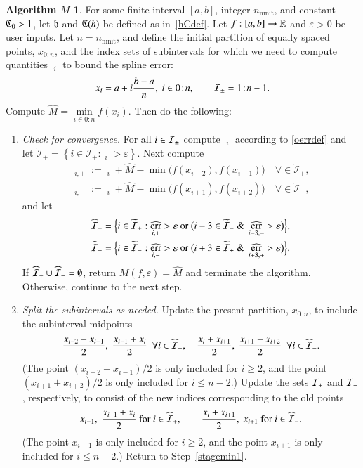 \documentclass[review]{elsarticle}
\newcommand{\abstol}{\varepsilon}
\newcommand{\zton}{0\!:\!n}
\theoremstyle{definition}
\newtheorem*{algoM}{Algorithm $M$}
\newcommand{\hM}{\widehat{M}}
\DeclareMathOperator{\ninit}{ninit}
\DeclareMathOperator{\oerr}{\overline{err}}
\DeclareMathOperator{\herr}{\widehat{err}}
\newcommand{\minfi}{\min\limits_{i \in 0:n} f(x_i)} %
\begin{document}
\begin{algoM} \label{AlgoM}
	For some finite interval $[a,b]$, integer $n_{\ninit}$, and constant $\mathfrak{C}_0 > 1$, let $\mathfrak{h}$ and $\mathfrak{C}(h)$ be defined as in~\eqref{hCdef}.  Let $f:[a,b] \to \mathbb{R}$ and $\abstol >0$ be user inputs. Let
	$n=n_{\ninit}$, and define the initial partition of equally spaced points, $x_{0:n}$, and the index sets of subintervals for which we need to compute quantities $\oerr_{i}$ to bound the spline error:
\[
x_i=a+ i\frac{b-a}{n}, \ i \in \zton, \qquad \ci_{\pm} =  1\!:\!n-1.
\]
	Compute $\hM= \minfi$.  
	Then do the
	following:
	
	\begin{enumerate}[\em Step 1.]
		
		\item \label{stagemin1} \emph{Check for convergence.} For all $i \in \mathcal{I}_{\pm}$ compute $\oerr_i $ according to \eqref{oerrdef} and let $\widetilde{\mathcal{I}}_{\pm} = \left\{i \in \mathcal{I}_{\pm}: \oerr_i  > \abstol \right\}$.  Next compute
		\begin{gather*}
		\herr_{i,+} := \oerr_i + \hM - \min\bigl(f(x_{i - 2}),f(x_{i-1})\bigr) \quad \forall \in \widetilde{\mathcal{I}}_{+}, \\
		\herr_{i,-} := \oerr_i + \hM - \min\bigl(f(x_{i +1}),f(x_{i+2})\bigr)  \quad \forall \in \widetilde{\mathcal{I}}_{-},		
		\end{gather*}
		and let 
		\begin{gather*}
				\widehat{\ci}_+ = \Bigl\{i \in \widetilde{\ci}_+:  \herr_{i,+} > \abstol \text{ or } \bigl( i-3 \in \widetilde{\ci}_- \text{ \& } \herr_{i-3,-} > \abstol \bigr) \Bigr\}, \\
				\widehat{\ci}_- = \Bigl\{i \in \widetilde{\ci}_-: \herr_{i,-} > \abstol \text{ or } \bigl( i+3\in \widetilde{\ci}_+ \text{ \& } \herr_{i+3,+} > \abstol \bigr) \Bigr\}.
		\end{gather*}
		If $\widehat{\mathcal{I}}_+ \cup \widehat{\mathcal{I}}_- =
		\emptyset$, return $M(f,\abstol) = \widehat{M}$ and terminate the algorithm.
		Otherwise, continue to the next step.
		
		\item \label{stagemin2} \emph{Split the subintervals as needed.}
		Update the present partition, $x_{0:n}$, to include the subinterval midpoints
		\begin{equation*}
		\frac{x_{i-2} +x_{i-1}}{2}, \ \frac{x_{i-1} +x_{i}}{2} \ \ \forall i \in \widehat{\ci}_+, \quad 
		\frac{x_{i} +x_{i+1}}{2}, \  \frac{x_{i+1} +x_{i+2}}{2} \ \ \forall  i \in \widehat{\ci}_-.
		\end{equation*}
		(The point $(x_{i-2}+x_{i-1})/2$ is only included for $i \ge 2$, and the point $(x_{i+1} +x_{i+2})/2$ is only included for $i \le n-2$.) Update the sets $\mathcal{I}_{+}$ and $\mathcal{I}_-$, respectively, to consist of the new indices corresponding to the old points 
		\[
		x_{i-1}, \ \frac{x_{i-1} +x_{i}}{2} \text{ for } i \in \widehat{\mathcal{I}}_+, \qquad  \frac{x_{i} +x_{i+1}}{2}, \  x_{i+1} \text{ for } i \in \widehat{\mathcal{I}}_-.
		\] 
		(The point $x_{i-1}$ is only included for $i \ge 2$, and the point $x_{i+1}$ is only included for $i \le n-2$.) Return to Step~\ref{stagemin1}.
	\end{enumerate}
\end{algoM}
\end{document}
